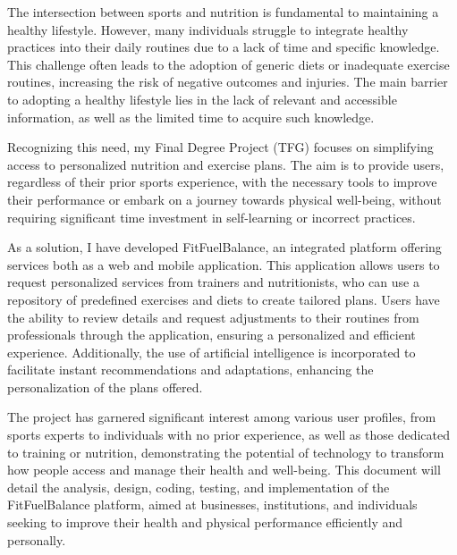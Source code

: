 The intersection between sports and nutrition is fundamental to maintaining a healthy lifestyle. However, many individuals struggle to integrate healthy practices into their daily routines due to a lack of time and specific knowledge. This challenge often leads to the adoption of generic diets or inadequate exercise routines, increasing the risk of negative outcomes and injuries. The main barrier to adopting a healthy lifestyle lies in the lack of relevant and accessible information, as well as the limited time to acquire such knowledge.

Recognizing this need, my Final Degree Project (TFG) focuses on simplifying access to personalized nutrition and exercise plans. The aim is to provide users, regardless of their prior sports experience, with the necessary tools to improve their performance or embark on a journey towards physical well-being, without requiring significant time investment in self-learning or incorrect practices.

As a solution, I have developed FitFuelBalance, an integrated platform offering services both as a web and mobile application. This application allows users to request personalized services from trainers and nutritionists, who can use a repository of predefined exercises and diets to create tailored plans. Users have the ability to review details and request adjustments to their routines from professionals through the application, ensuring a personalized and efficient experience. Additionally, the use of artificial intelligence is incorporated to facilitate instant recommendations and adaptations, enhancing the personalization of the plans offered.

The project has garnered significant interest among various user profiles, from sports experts to individuals with no prior experience, as well as those dedicated to training or nutrition, demonstrating the potential of technology to transform how people access and manage their health and well-being. This document will detail the analysis, design, coding, testing, and implementation of the FitFuelBalance platform, aimed at businesses, institutions, and individuals seeking to improve their health and physical performance efficiently and personally.


